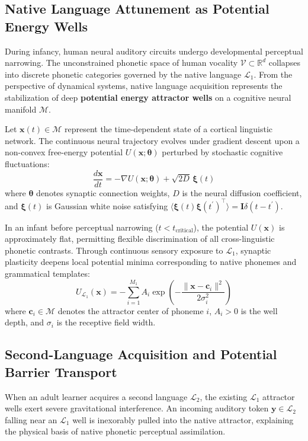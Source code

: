 \documentclass[11pt,letterpaper]{article}
\begin{document}
\subsection{Native Language Attunement as Potential Energy Wells}
During infancy, human neural auditory circuits undergo developmental perceptual narrowing. The unconstrained phonetic space of human vocality $\mathcal{V} \subset \mathbb{R}^d$ collapses into discrete phonetic categories governed by the native language $\mathcal{L}_1$. From the perspective of dynamical systems, native language acquisition represents the stabilization of deep \textbf{potential energy attractor wells} on a cognitive neural manifold $\mathcal{M}$.

Let $\mathbf{x}(t) \in \mathcal{M}$ represent the time-dependent state of a cortical linguistic network. The continuous neural trajectory evolves under gradient descent upon a non-convex free-energy potential $U(\mathbf{x}; \boldsymbol{\theta})$ perturbed by stochastic cognitive fluctuations:
\begin{equation}
\frac{d\mathbf{x}}{dt} = -\nabla U(\mathbf{x}; \boldsymbol{\theta}) + \sqrt{2 D}\, \boldsymbol{\xi}(t)
\end{equation}
where $\boldsymbol{\theta}$ denotes synaptic connection weights, $D$ is the neural diffusion coefficient, and $\boldsymbol{\xi}(t)$ is Gaussian white noise satisfying $\langle \boldsymbol{\xi}(t) \boldsymbol{\xi}(t^\prime)^\top \rangle = \mathbf{I} \delta(t - t^\prime)$. 

In an infant before perceptual narrowing ($t < t_{\text{critical}}$), the potential $U(\mathbf{x})$ is approximately flat, permitting flexible discrimination of all cross-linguistic phonetic contrasts. Through continuous sensory exposure to $\mathcal{L}_1$, synaptic plasticity deepens local potential minima corresponding to native phonemes and grammatical templates:
\begin{equation}
U_{\mathcal{L}_1}(\mathbf{x}) = -\sum_{i=1}^{M_1} A_i \exp\left( -\frac{\|\mathbf{x} - \mathbf{c}_i\|^2}{2\sigma_i^2} \right)
\end{equation}
where $\mathbf{c}_i \in \mathcal{M}$ denotes the attractor center of phoneme $i$, $A_i > 0$ is the well depth, and $\sigma_i$ is the receptive field width.

\subsection{Second-Language Acquisition and Potential Barrier Transport}
When an adult learner acquires a second language $\mathcal{L}_2$, the existing $\mathcal{L}_1$ attractor wells exert severe gravitational interference. An incoming auditory token $\mathbf{y} \in \mathcal{L}_2$ falling near an $\mathcal{L}_1$ well is inexorably pulled into the native attractor, explaining the physical basis of native phonetic perceptual assimilation.
\end{document}
